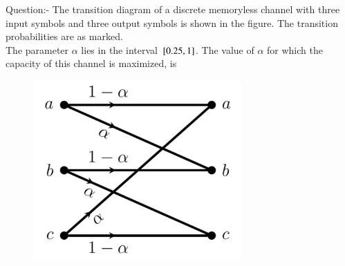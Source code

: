 \documentclass[journal,12pt,twocolumn]{IEEEtran}
\theoremstyle{remark}
\begin{document}
%
Question:-
The transition diagram of a discrete memoryless channel with three input symbols
and three output symbols is shown in the figure. The transition probabilities are as
marked.\\
The parameter $\alpha$ lies in the interval ${}\left[0.25,1\right]$. The value of $\alpha$ for which the capacity of this channel is maximized, is
\begin{figure}[!ht]
\centering
\includegraphics[width=\columnwidth/3]{2022/EC/61/figs/figure1.png}
\label{Fig:1}
\end{figure}
\fi
\solution
\end{document}
